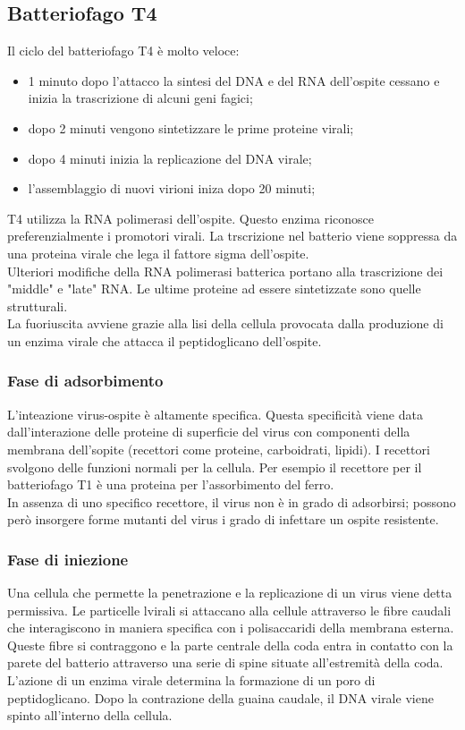 \subsection{Batteriofago T4}
Il ciclo del batteriofago T4 è molto veloce:
\begin{itemize}
    \item 1 minuto dopo l'attacco la sintesi del DNA e del RNA dell'ospite cessano e inizia la trascrizione di alcuni geni fagici;
    \item dopo 2 minuti vengono sintetizzare le prime proteine virali;
    \item dopo 4 minuti inizia la replicazione del DNA virale;
    \item l'assemblaggio di nuovi virioni iniza dopo 20 minuti; 
\end{itemize}
T4 utilizza la RNA polimerasi dell'ospite. Questo enzima riconosce preferenzialmente i promotori virali. La trscrizione nel batterio viene soppressa da una proteina virale che lega il fattore sigma dell'ospite. 
\\Ulteriori modifiche della RNA polimerasi batterica portano alla trascrizione dei "middle" e "late" RNA. Le ultime proteine ad essere sintetizzate sono quelle strutturali. 
\\La fuoriuscita avviene grazie alla lisi della cellula provocata dalla produzione di un enzima virale che attacca il peptidoglicano dell'ospite. 
\subsubsection{Fase di adsorbimento}
L'inteazione virus-ospite è altamente specifica. Questa specificità viene data dall'interazione delle proteine di superficie del virus con componenti della membrana dell'sopite (recettori come proteine, carboidrati, lipidi). I recettori svolgono delle funzioni normali per la cellula. Per esempio il recettore per il batteriofago T1 è una proteina per l'assorbimento del ferro. 
\\In assenza di uno specifico recettore, il virus non è in grado di adsorbirsi; possono però insorgere forme mutanti del virus i grado di infettare un ospite resistente.
\subsubsection{Fase di iniezione}
Una cellula che permette la penetrazione e la replicazione di un virus viene detta permissiva. Le particelle lvirali si attaccano alla cellule attraverso le fibre caudali che interagiscono in maniera specifica con i polisaccaridi della membrana esterna. Queste fibre si contraggono e la parte centrale della coda entra in contatto con la parete del batterio attraverso una serie di spine situate all'estremità della coda. 
\\L'azione di un enzima virale determina la formazione di un poro di peptidoglicano. Dopo la contrazione della guaina caudale, il DNA virale viene spinto all'interno della cellula.
